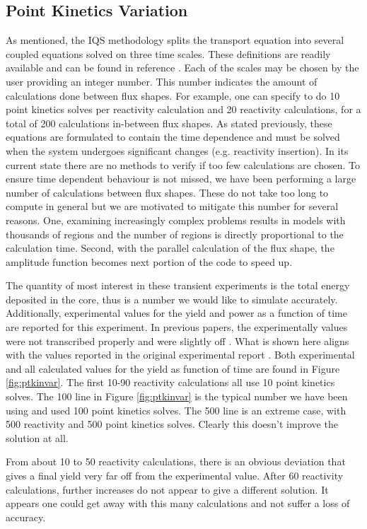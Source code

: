 \documentclass{anstrans}
\begin{document}
\subsection{Point Kinetics Variation}
As mentioned, the IQS methodology  splits the transport equation into several coupled equations solved on three time scales.  These definitions are readily available and can be found in reference \cite{Bentley}.  Each of the scales may be chosen by the user providing an integer number.  This number indicates the amount of calculations done between flux shapes.  For example, one can specify to do 10 point kinetics solves per reactivity calculation and 20 reactivity calculations, for a total of 200 calculations in-between flux shapes.  As stated previously, these equations are formulated to contain the time dependence and must be solved when the system undergoes significant changes (e.g. reactivity insertion).  In its current state there are no methods to verify if too few calculations are chosen. To ensure time dependent behaviour is not missed, we have been performing a large number of calculations between flux shapes.  These do not take too long to compute in general but we are motivated to mitigate this number for several reasons.  One, examining increasingly complex problems results in models with thousands of regions and the number of regions is directly proportional to the calculation time.  Second, with the parallel calculation of the flux shape, the amplitude function becomes next portion of the code to speed up.

   The quantity of most interest in these transient experiments is the total energy deposited in the core, thus is a number we would like to simulate accurately.  Additionally, experimental values for the yield and power as a function of time are reported for this experiment.  In previous  papers, the experimentally values were not transcribed properly and were slightly off \cite{physor_mausolff}.  What is shown here aligns with the values reported in the original experimental report \cite{Robinson_Bauer_1994}.  Both experimental and all calculated values for the yield as function of time are found in Figure \ref{fig:ptkinvar}.  The first 10-90 reactivity calculations all use 10 point kinetics solves.  The 100 line in Figure \ref{fig:ptkinvar} is the typical number we have been using and used 100 point kinetics solves.  The 500 line is an extreme case, with 500 reactivity and 500 point kinetics solves. Clearly this doesn't improve the solution at all.
   
   From about 10 to 50 reactivity calculations, there is an obvious deviation that gives a final yield very far off from the experimental value.  After 60 reactivity calculations, further increases do not appear to give a different solution.  It appears one could get away with this many calculations and not suffer a loss of accuracy.
\end{document}
